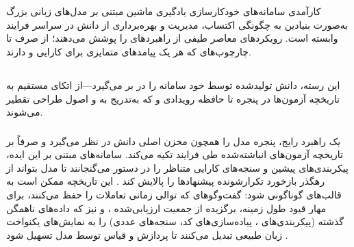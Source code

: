 \section[تحلیل منابع دانش]{}

کارآمدی سامانه‌های خودکارسازی یادگیری ماشین مبتنی بر مدل‌های زبانی بزرگ به‌صورت بنیادین به چگونگی اکتساب، مدیریت و بهره‌برداری از دانش در سراسر فرایند  وابسته است. رویکردهای معاصر طیفی از راهبردهای  را پوشش می‌دهند؛ از  صرف تا چارچوب‌های  که هر یک پیامدهای متمایزی برای کارایی  و  دارند.

\subsection[دانش درونی: تاریخچه آزمون و بازتاب]{}
این رسته، دانش تولیدشده توسط خود سامانه را در بر می‌گیرد—از اتکای مستقیم به تاریخچه آزمون‌ها در پنجره  تا حافظه رویدادی و  که به‌تدریج به  و اصول طراحی تقطیر می‌شوند.
\subsubsection{\protect{}}

یک راهبرد رایج، پنجره  مدل را همچون مخزن اصلی دانش در نظر می‌گیرد و صرفاً بر تاریخچه آزمون‌های انباشته‌شده طی فرایند  تکیه می‌کند. سامانه‌های مبتنی بر این ایده، پیکربندی‌های پیشین و سنجه‌های کارایی متناظر را در دستور می‌گنجانند تا مدل بتواند از رهگذر بازخورد تکرارشونده پیشنهادها را پالایش کند \cite{zhang2023usingLLMforHPO, zheng2023GENIUS, liu2024LLAMBO}. این تاریخچه ممکن است به قالب‌های گوناگونی  شود: گفت‌وگوهای  که توالی زمانی تعاملات را حفظ می‌کنند،  برای مهار قیود طول زمینه،  برگزیده از جمعیت ارزیابی‌شده \cite{zhang2023usingLLMforHPO, chen2023Evoprompting}، و نیز  که داده‌های ناهمگن گذشته (پیکربندی‌های ، پیاده‌سازی‌های کد، سنجه‌های عددی) را به نمایش‌های یکنواخت زبان طبیعی تبدیل می‌کنند تا پردازش و قیاس توسط مدل تسهیل شود \cite{zhang-etal-2024-MLCopilot}.

